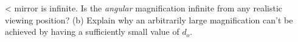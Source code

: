 <%
mirror is infinite. Is the \emph{angular} magnification
infinite from any realistic viewing position? (b) Explain
why an arbitrarily large magnification can't be achieved by
having a sufficiently small value of $d_o$.
